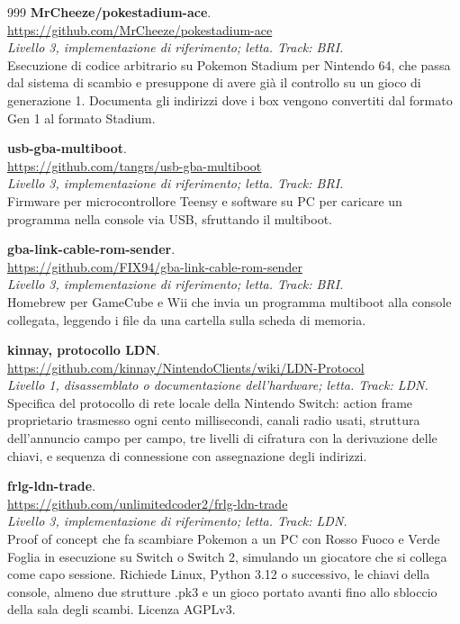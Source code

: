 \begin{thebibliography}{999}
  \textbf{MrCheeze/pokestadium-ace}.
  \\ \url{https://github.com/MrCheeze/pokestadium-ace}
  \\ \emph{Livello 3, implementazione di riferimento; letta. Track: BRI.}
  \\ Esecuzione di codice arbitrario su Pokemon Stadium per Nintendo 64, che passa dal sistema di scambio e presuppone di avere già il controllo su un gioco di generazione 1. Documenta gli indirizzi dove i box vengono convertiti dal formato Gen 1 al formato Stadium.

  \textbf{usb-gba-multiboot}.
  \\ \url{https://github.com/tangrs/usb-gba-multiboot}
  \\ \emph{Livello 3, implementazione di riferimento; letta. Track: BRI.}
  \\ Firmware per microcontrollore Teensy e software su PC per caricare un programma nella console via USB, sfruttando il multiboot.

  \textbf{gba-link-cable-rom-sender}.
  \\ \url{https://github.com/FIX94/gba-link-cable-rom-sender}
  \\ \emph{Livello 3, implementazione di riferimento; letta. Track: BRI.}
  \\ Homebrew per GameCube e Wii che invia un programma multiboot alla console collegata, leggendo i file da una cartella sulla scheda di memoria.

  \textbf{kinnay, protocollo LDN}.
  \\ \url{https://github.com/kinnay/NintendoClients/wiki/LDN-Protocol}
  \\ \emph{Livello 1, disassemblato o documentazione dell'hardware; letta. Track: LDN.}
  \\ Specifica del protocollo di rete locale della Nintendo Switch: action frame proprietario trasmesso ogni cento millisecondi, canali radio usati, struttura dell'annuncio campo per campo, tre livelli di cifratura con la derivazione delle chiavi, e sequenza di connessione con assegnazione degli indirizzi.

  \textbf{frlg-ldn-trade}.
  \\ \url{https://github.com/unlimitedcoder2/frlg-ldn-trade}
  \\ \emph{Livello 3, implementazione di riferimento; letta. Track: LDN.}
  \\ Proof of concept che fa scambiare Pokemon a un PC con Rosso Fuoco e Verde Foglia in esecuzione su Switch o Switch 2, simulando un giocatore che si collega come capo sessione. Richiede Linux, Python 3.12 o successivo, le chiavi della console, almeno due strutture .pk3 e un gioco portato avanti fino allo sbloccio della sala degli scambi. Licenza AGPLv3.


\end{thebibliography}

